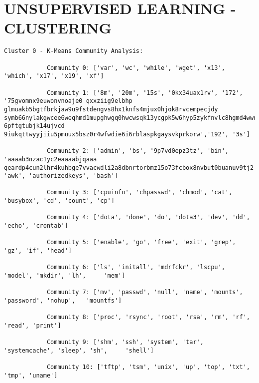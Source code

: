 
\section{UNSUPERVISED LEARNING - CLUSTERING}

    
    
    \begin{lstlisting}[caption={Cluster 0 - K-Means Community Analysis}, label={lst:cluster-0-k-means-community-analysis}]
            Cluster 0 - K-Means Community Analysis:

            Community 0: ['var', 'wc', 'while', 'wget', 'x13', 'which', 'x17', 'x19', 'xf']

            Community 1: ['8m', '20m', '15s', '0kx34uax1rv', '172', '75gvomnx9euwonvnoaje0 qxxziig9elbhp glmuakb5bgtfbrkjaw9u9fstdengvs8hx1knfs4mjux0hjok8rvcempecjdy symb66nylakgwcee6weqhmd1mupghwgq0hwcwsqk13ycgpk5w6hyp5zykfnvlc8hgmd4wwu97k 6pftgtubjk14ujvcd 9iukqttwyyjiiu5pmuux5bsz0r4wfwdie6i6rblaspkgaysvkprkorw','192', '3s']

            Community 2: ['admin', 'bs', '9p7vd0epz3tz', 'bin', 'aaaab3nzac1yc2eaaaabjqaaa qeardp4cun2lhr4kuhbge7vvacwdli2a8dbnrtorbmz15o73fcbox8nvbut0buanuv9tj2',   'awk', 'authorizedkeys', 'bash']

            Community 3: ['cpuinfo', 'chpasswd', 'chmod', 'cat', 'busybox', 'cd', 'count', 'cp']

            Community 4: ['dota', 'done', 'do', 'dota3', 'dev', 'dd', 'echo', 'crontab']

            Community 5: ['enable', 'go', 'free', 'exit', 'grep', 'gz', 'if', 'head']

            Community 6: ['ls', 'initall', 'mdrfckr', 'lscpu', 'model', 'mkdir', 'lh',     'mem']

            Community 7: ['mv', 'passwd', 'null', 'name', 'mounts', 'password', 'nohup',   'mountfs']

            Community 8: ['proc', 'rsync', 'root', 'rsa', 'rm', 'rf', 'read', 'print']

            Community 9: ['shm', 'ssh', 'system', 'tar', 'systemcache', 'sleep', 'sh',     'shell']

            Community 10: ['tftp', 'tsm', 'unix', 'up', 'top', 'txt', 'tmp', 'uname']
            
    \end{lstlisting}
    
